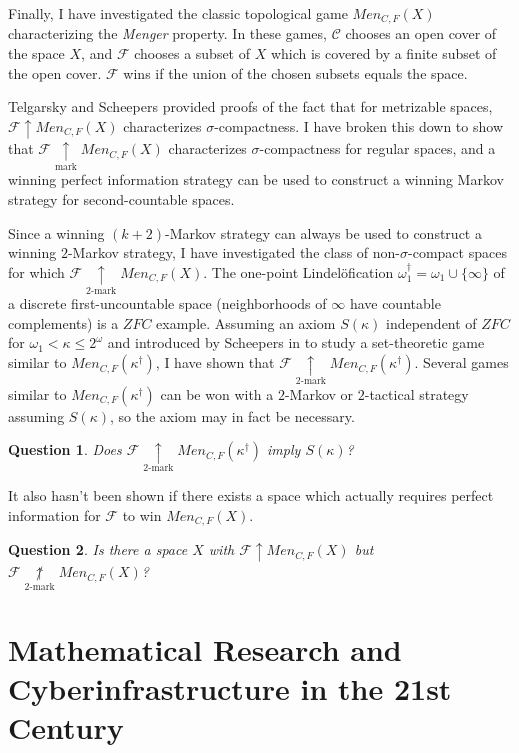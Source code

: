 \documentclass[11pt]{amsart}
\theoremstyle{plain}
\newtheorem{question}{Question}
\newcommand{\win}{\uparrow}
\newcommand{\markwin}{\underset{\text{mark}}{\uparrow}}
\newcommand{\kmarkwin}[1]{\underset{#1\text{-mark}}{\uparrow}}
\newcommand{\notkmarkwin}[1]{\underset{#1\text{-mark}}{\not\uparrow}}
\newcommand{\oneptlind}[1]{#1^\dagger}
\newcommand{\menGame}[1]{Men_{C,F}(#1)}
\newcommand{\<}{\langle}
\renewcommand{\>}{\rangle}
\newcommand{\alcompS}[1]{S(#1)}
\newcommand{\pl}[1]{\mathscr{#1}}
\newcommand{\term}{\textit}
\begin{document}
Finally, I have investigated the classic topological game $\menGame{X}$
characterizing the \term{Menger} property.
In these games, $\pl C$ chooses an open cover of the space $X$,
and $\pl F$ chooses a subset of $X$ which is covered by a
finite subset of the open cover. $\pl F$ wins if the union of the chosen
subsets equals the space.

Telgarsky \cite{MR753073} and Scheepers \cite{MR1273523} provided proofs of
the fact that for metrizable spaces, $\pl F\win\menGame{X}$
characterizes $\sigma$-compactness. I have broken this down to show that
$\pl F\markwin\menGame{X}$ characterizes $\sigma$-compactness for regular
spaces, and a winning perfect information strategy can be used to construct
a winning Markov strategy for second-countable spaces.

Since a winning $(k+2)$-Markov strategy can always be used to construct a
winning $2$-Markov strategy, I have investigated the class of
non-$\sigma$-compact spaces for which $\pl F\kmarkwin{2}\menGame{X}$.
The one-point Lindel\"ofication $\oneptlind\omega_1=\omega_1\cup\{\infty\}$
of a discrete first-uncountable space (neighborhoods of $\infty$ have countable
complements) is a $ZFC$ example. Assuming an axiom $\alcompS\kappa$
independent of $ZFC$ for $\omega_1<\kappa\leq 2^\omega$
and introduced by Scheepers in \cite{MR1129143}
to study a set-theoretic game similar to $\menGame{\oneptlind\kappa}$,
I have shown that $\pl F\kmarkwin{2}\menGame{\oneptlind\kappa}$. Several
games similar to $\menGame{\oneptlind\kappa}$ can be won with a $2$-Markov
or $2$-tactical strategy assuming $\alcompS\kappa$, so the axiom may in fact be
necessary.

\begin{question}
  Does $\pl F\kmarkwin{2}\menGame{\oneptlind\kappa}$ imply $\alcompS\kappa$?
\end{question}

It also hasn't been shown if there exists a space which actually requires
perfect information for $\pl F$ to win $\menGame{X}$.

\begin{question}
  Is there a space $X$ with $\pl F\win\menGame{X}$ but
  $\pl F\notkmarkwin{2}\menGame{X}$?
\end{question}


\section*{Mathematical Research and Cyberinfrastructure in the 21st Century}
\end{document}
